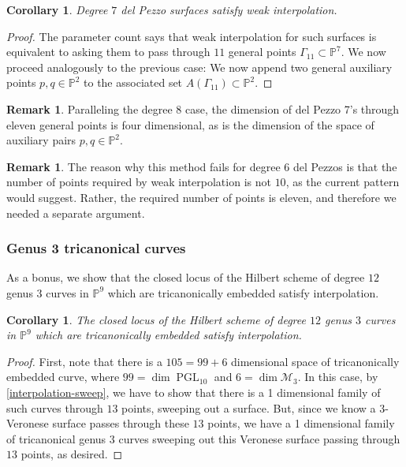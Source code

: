 \documentclass[reqno, 11pt]{amsart}
\theoremstyle{definition}
\theoremstyle{remark}
\numberwithin{equation}{section}
\numberwithin{thm}{section}
\numberwithin{prop}{section}
\numberwithin{lem}{section}
\numberwithin{cor}{section}
\numberwithin{conj}{section}
\numberwithin{defn}{section}
\DeclareMathOperator\PGL{PGL}
\theoremstyle{plain}
\newtheorem{corollary}[theorem]{Corollary}
\theoremstyle{definition}
\newtheorem{remark}[theorem]{Remark}
\newcommand\sssec{\subsubsection}
\newcommand\bp{{\mathbb P}}
\begin{document}
\begin{corollary}
  \label{corollary:degree-7-interpolation}
Degree $7$ del Pezzo surfaces satisfy weak interpolation.
\end{corollary}

\begin{proof}
The parameter count says that weak interpolation for such surfaces is equivalent to asking them to pass through $11$ general points $\Gamma_{11} \subset \bp^{7}$.  We now proceed analogously to the previous case: We now append two general auxiliary points $p,q \in \bp^{2}$ to the associated set $A(\Gamma_{11}) \subset \bp^{2}$. 
\end{proof}

\begin{remark}
Paralleling the degree $8$ case, the dimension of del Pezzo 7's through eleven general points is four dimensional, as is the dimension of the space of auxiliary pairs $p,q \in \bp^{2}$. 
\end{remark}

\begin{remark}
The reason why this method fails for degree $6$ del Pezzos is that the number of points required by weak interpolation is not $10$, as the current pattern would suggest.  Rather, the required number of points is eleven, and therefore we needed a separate argument. 
\end{remark}

\sssec{Genus 3 tricanonical curves}

As a bonus, we show that the closed locus of the Hilbert scheme of
degree $12$ genus $3$ curves in $\bp^9$ which are tricanonically
embedded satisfy interpolation.

\begin{corollary}
	\label{corollary:tricanonical}
	The closed locus of the Hilbert scheme of degree $12$ genus $3$
	curves in $\bp^9$ which are tricanonically embedded satisfy interpolation.
\end{corollary}
\begin{proof}
	First, note that there is a $105 = 99 + 6$ dimensional space of
	tricanonically embedded curve, where $99 = \dim \PGL_{10}$ and
	$6 = \dim \mathscr M_3$. In this case, by \ref{interpolation-sweep},
	we have to show that there is a 1 dimensional
	family of such curves through $13$ points, sweeping out a surface.
	But, since we know a $3$-Veronese surface passes through these $13$
	points, we have a 1 dimensional family of tricanonical genus $3$ curves
	sweeping out this Veronese surface passing through $13$ points, as desired.
\end{proof}
\end{document}
